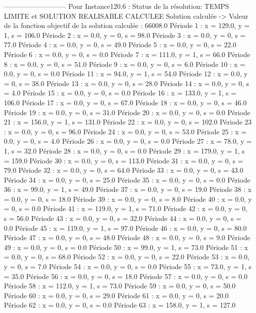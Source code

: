 ---------------------------
Pour Instance120.6 :
Status de la résolution: TEMPS LIMITE et SOLUTION REALISABLE CALCULEE
Solution calculée
-> Valeur de la fonction objectif de la solution calculée :  66008.0
Période 1 : x = 129.0, y = 1, s = 106.0
Période 2 : x = 0.0, y = 0, s = 98.0
Période 3 : x = 0.0, y = 0, s = 77.0
Période 4 : x = 0.0, y = 0, s = 49.0
Période 5 : x = 0.0, y = 0, s = 22.0
Période 6 : x = 0.0, y = 0, s = 0.0
Période 7 : x = 111.0, y = 1, s = 66.0
Période 8 : x = 0.0, y = 0, s = 51.0
Période 9 : x = 0.0, y = 0, s = 6.0
Période 10 : x = 0.0, y = 0, s = 0.0
Période 11 : x = 94.0, y = 1, s = 54.0
Période 12 : x = 0.0, y = 0, s = 38.0
Période 13 : x = 0.0, y = 0, s = 28.0
Période 14 : x = 0.0, y = 0, s = 4.0
Période 15 : x = 0.0, y = 0, s = 0.0
Période 16 : x = 133.0, y = 1, s = 106.0
Période 17 : x = 0.0, y = 0, s = 67.0
Période 18 : x = 0.0, y = 0, s = 46.0
Période 19 : x = 0.0, y = 0, s = 31.0
Période 20 : x = 0.0, y = 0, s = 0.0
Période 21 : x = 156.0, y = 1, s = 131.0
Période 22 : x = 0.0, y = 0, s = 102.0
Période 23 : x = 0.0, y = 0, s = 96.0
Période 24 : x = 0.0, y = 0, s = 53.0
Période 25 : x = 0.0, y = 0, s = 4.0
Période 26 : x = 0.0, y = 0, s = 0.0
Période 27 : x = 78.0, y = 1, s = 32.0
Période 28 : x = 0.0, y = 0, s = 0.0
Période 29 : x = 179.0, y = 1, s = 159.0
Période 30 : x = 0.0, y = 0, s = 113.0
Période 31 : x = 0.0, y = 0, s = 79.0
Période 32 : x = 0.0, y = 0, s = 64.0
Période 33 : x = 0.0, y = 0, s = 43.0
Période 34 : x = 0.0, y = 0, s = 25.0
Période 35 : x = 0.0, y = 0, s = 0.0
Période 36 : x = 99.0, y = 1, s = 49.0
Période 37 : x = 0.0, y = 0, s = 19.0
Période 38 : x = 0.0, y = 0, s = 18.0
Période 39 : x = 0.0, y = 0, s = 8.0
Période 40 : x = 0.0, y = 0, s = 0.0
Période 41 : x = 119.0, y = 1, s = 71.0
Période 42 : x = 0.0, y = 0, s = 56.0
Période 43 : x = 0.0, y = 0, s = 32.0
Période 44 : x = 0.0, y = 0, s = 0.0
Période 45 : x = 119.0, y = 1, s = 97.0
Période 46 : x = 0.0, y = 0, s = 80.0
Période 47 : x = 0.0, y = 0, s = 48.0
Période 48 : x = 0.0, y = 0, s = 9.0
Période 49 : x = 0.0, y = 0, s = 0.0
Période 50 : x = 99.0, y = 1, s = 73.0
Période 51 : x = 0.0, y = 0, s = 68.0
Période 52 : x = 0.0, y = 0, s = 22.0
Période 53 : x = 0.0, y = 0, s = 7.0
Période 54 : x = 0.0, y = 0, s = 0.0
Période 55 : x = 73.0, y = 1, s = 35.0
Période 56 : x = 0.0, y = 0, s = 18.0
Période 57 : x = 0.0, y = 0, s = 0.0
Période 58 : x = 112.0, y = 1, s = 73.0
Période 59 : x = 0.0, y = 0, s = 50.0
Période 60 : x = 0.0, y = 0, s = 29.0
Période 61 : x = 0.0, y = 0, s = 20.0
Période 62 : x = 0.0, y = 0, s = 0.0
Période 63 : x = 158.0, y = 1, s = 127.0
